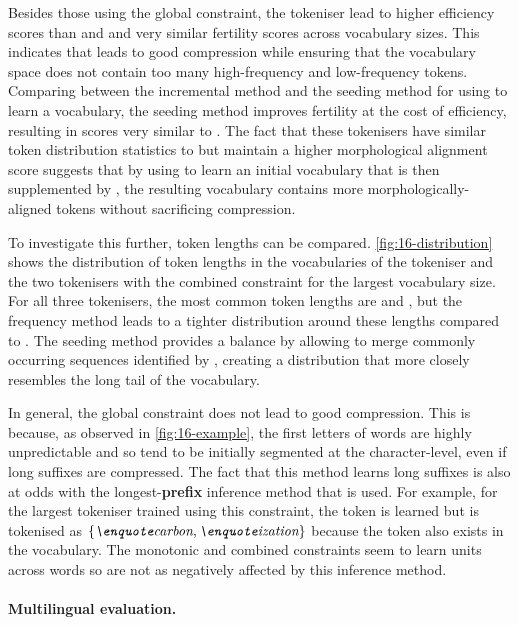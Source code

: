 Besides those using the global constraint, the \tokname tokeniser lead to higher \renyi efficiency scores than \bpe and \bpewp and very similar fertility scores across vocabulary sizes. This indicates that \tokname leads to good compression while ensuring that the vocabulary space does not contain too many high-frequency and low-frequency tokens. Comparing between the incremental method and the seeding method for using \tokname to learn a vocabulary, the seeding method improves fertility at the cost of \renyi efficiency, resulting in scores very similar to \bpewp. The fact that these tokenisers have similar token distribution statistics to \bpewp but maintain a higher morphological alignment score suggests that by using \tokname to learn an initial vocabulary that is then supplemented by \bpe, the resulting vocabulary contains more morphologically-aligned tokens without sacrificing compression.

To investigate this further, token lengths can be compared. \cref{fig:16-distribution} shows the distribution of token lengths in the vocabularies of the \bpewp tokeniser and the two \tokname tokenisers with the combined constraint for the largest vocabulary size. For all three tokenisers, the most common token lengths are  and , but the frequency method leads to a tighter distribution around these lengths compared to \bpewp. The seeding method provides a balance by allowing \bpe to merge commonly occurring sequences identified by \tokname, creating a distribution that more closely resembles the long tail of the \bpewp vocabulary.

In general, the global constraint does not lead to good compression. This is because, as observed in \cref{fig:16-example}, the first letters of words are highly unpredictable and so tend to be initially segmented at the character-level, even if long suffixes are compressed. The fact that this method learns long suffixes is also at odds with the longest-\textbf{prefix} inference method that is used. For example, for the largest tokeniser trained using this constraint, the token  is learned but  is tokenised as \(\{\ex{carbon},\ex{ization}\}\) because the token  also exists in the vocabulary. The monotonic and combined constraints seem to learn units across words so are not as negatively affected by this inference method.

\paragraph{Multilingual evaluation.}

